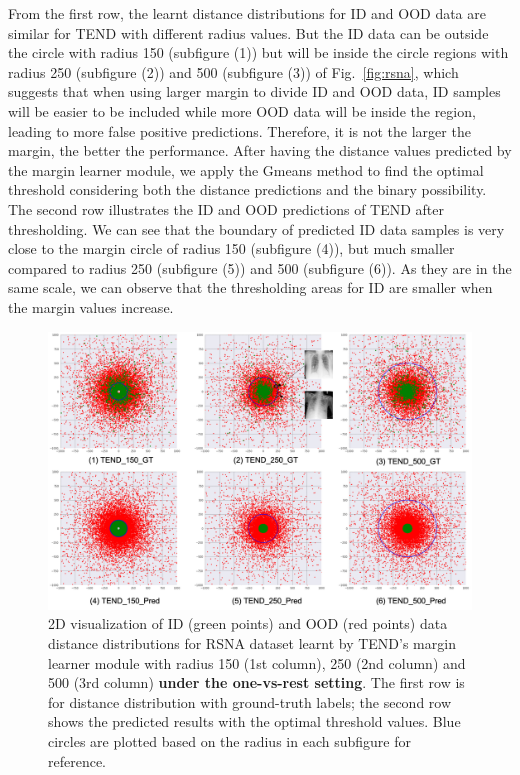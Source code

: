 \documentclass[12pt]{spieman}  %
\begin{document}
\begin{spacing}{2}
From the first row, the learnt distance distributions for ID and OOD data are similar for TEND with different radius values. But the ID data can be outside the circle with radius 150 (subfigure (1)) but will be inside the circle regions with radius 250 (subfigure (2)) and 500 (subfigure (3)) of Fig.~\ref{fig:rsna}, which suggests that when using larger margin to divide ID and OOD data, ID samples will be easier to be included while more OOD data will be inside the region, leading to more false positive predictions. Therefore, it is not the larger the margin, the better the performance. 
After having the distance values predicted by the margin learner module, we apply the Gmeans method to find the optimal threshold considering both the distance predictions and the binary possibility. The second row illustrates the ID and OOD predictions of TEND after thresholding. We can see that the boundary of predicted ID data samples is very close to the margin circle of radius 150 (subfigure (4)), but much smaller compared to radius 250 (subfigure (5)) and 500 (subfigure (6)). As they are in the same scale, we can observe that the thresholding areas for ID are smaller when the margin values increase. 
\begin{figure}[htp]
\begin{center}
  \includegraphics[width=\linewidth]{fig3.png}
\end{center}
  \caption{2D visualization of ID (green points) and OOD (red points) data distance distributions for RSNA dataset learnt by TEND's margin learner module with radius 150 (1st column), 250 (2nd column) and 500 (3rd column) \textbf{under the one-vs-rest setting}. The first row is for distance distribution with ground-truth labels; the second row shows the predicted results with the optimal threshold values. Blue circles are plotted based on the radius in each subfigure for reference.} 

\end{figure}
\end{spacing}
\end{document}
